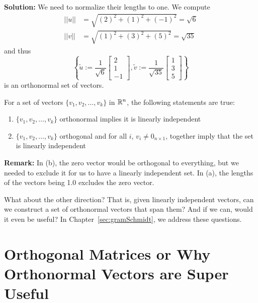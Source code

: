 \textbf{Solution:} We need to normalize their lengths to one. We compute
\begin{align*}
    ||u||&= \sqrt{(2)^2 + (1)^2 + (-1)^2} = \sqrt{6}\\
    ||v||&= \sqrt{(1)^2 + (3)^2 + (5)^2} = \sqrt{35}
\end{align*}
and thus 
$$\left\{\tilde{u}:= \frac{1}{\sqrt{6}}  \left[ \begin{array}{r} 2 \\ 1 \\ -1\end{array} \right],  \tilde{v}:= \frac{1}{\sqrt{35}}  \left[ \begin{array}{r} 1\\ 3\\ 5 \end{array} \right] \right\}$$
is an orthonormal set of vectors. \Qed 

\vspace*{.2cm}

\begin{tcolorbox}[title=\textbf{\Large Orthonormal Vectors are Linearly Independent}]
For a set of vectors $\{ v_1, v_2, \ldots, v_k\}$ in $\mathbb R^n$, the following statements are true:
\begin{enumerate}
\renewcommand{\labelenumi}{(\alph{enumi})}
\setlength{\itemsep}{.2cm}
    \item  $\{ v_1, v_2, \ldots, v_k\}$ orthonormal implies it is linearly independent
    \item  $\{ v_1, v_2, \ldots, v_k\}$ orthogonal and  for all $i$, $v_i \neq 0_{n \times 1}$, together imply that the set is linearly independent
\end{enumerate}

\textbf{Remark:} In (b), the zero vector would be orthogonal to everything, but we needed to exclude it for us to have a linearly independent set. In (a), the lengths of the vectors being 1.0 excludes the zero vector. 
   
\end{tcolorbox}

\vspace*{.2cm}

What about the other direction? That is, given linearly independent vectors, can we construct a set of orthonormal vectors that span them? And if we can, would it even be useful? In Chapter~\ref{sec:gramSchmidt}, we address these questions.

\section{Orthogonal Matrices or Why Orthonormal Vectors are Super Useful}

